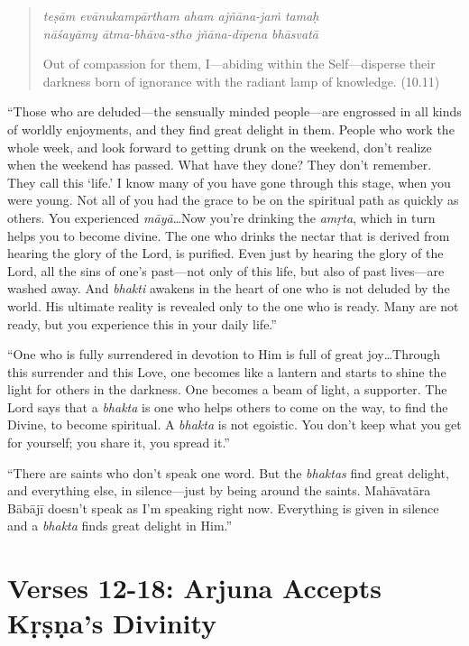 \documentclass[12pt, twoside, openright]{memoir}
\begin{document}
\par
\begin{verse}
\textit{teṣām evānukampārtham aham ajñāna-jaṁ tamaḥ} \\
\textit{nāśayāmy ātma-bhāva-stho jñāna-dīpena bhāsvatā}

\noindent Out of compassion for them, I---abiding within the Self---disperse their darkness born of ignorance with the radiant lamp of knowledge. (10.11)
\end{verse}
\par


\enquote{Those who are deluded---the sensually minded people---are engrossed in all kinds of worldly enjoyments, and they find great delight in them. People who work the whole week, and look forward to getting drunk on the weekend, don’t realize when the weekend has passed. What have they done? They don’t remember. They call this \enquote{life.} I know many of you have gone through this stage, when you were young. Not all of you had the grace to be on the spiritual path as quickly as others. You experienced \textit{māyā}\ldots Now you’re drinking the \textit{amṛta}, which in turn helps you to become divine. The one who drinks the nectar that is derived from hearing the glory of the Lord, is purified. Even just by hearing the glory of the Lord, all the sins of one’s past---not only of this life, but also of past lives---are washed away. And \textit{bhakti} awakens in the heart of one who is not deluded by the world. His ultimate reality is revealed only to the one who is ready. Many are not ready, but you experience this in your daily life.}

\enquote{One who is fully surrendered in devotion to Him is full of great joy\ldots Through this surrender and this Love, one becomes like a lantern and starts to shine the light for others in the darkness. One becomes a beam of light, a supporter. The Lord says that a \textit{bhakta} is one who helps others to come on the way, to find the Divine, to become spiritual. A \textit{bhakta} is not egoistic. You don’t keep what you get for yourself; you share it, you spread it.}

\enquote{There are saints who don’t speak one word. But the \textit{bhaktas} find great delight, and everything else, in silence---just by being around the saints. Mahāvatāra Bābājī doesn’t speak as I’m speaking right now. Everything is given in silence and a \textit{bhakta} finds great delight in Him.}

\newpage
\section{Verses 12-18: Arjuna Accepts Kṛṣṇa's Divinity}\label{sec-verses-12-18-arjuna-accepts-krsna-s-divinity}
\end{document}
